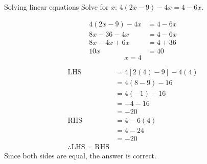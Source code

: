 %     
% 
% 
% 
% 

\begin{wex}
{Solving linear equations }
{Solve for $x$: $4(2x-9)-4x=4-6x$.}
{%

\begin{align*}
  4(2x-9)-4x &= 4-6x \\
  8x-36-4x &= 4-6x \\
  8x-4x+6x &= 4+36 \\
  10x &= 40
\end{align*}
\begin{equation*}
  x = 4
\end{equation*}

\begin{align*}
  \mbox{LHS} &= 4\left[2(4)-9\right]-4(4)\\
  &=4(8-9)-16\\
  &=4(-1)-16\\
  &=-4-16\\
  &=-20\\

\mbox{RHS} &= 4-6(4) \\
  &= 4-24 \\
  &= -20 \\
\therefore \mbox{LHS} = \mbox{RHS}
\end{align*}
Since both sides are equal, the answer is correct. 
}
\end{wex}

